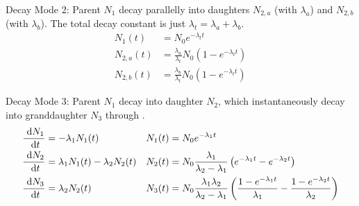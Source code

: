 \documentclass{school-22.101-notes}
\begin{document}
Decay Mode 2: Parent $N_1$ decay parallelly into daughters $N_{2,a}$ (with $\lambda_a$) and $N_{2,b}$ (with $\lambda_b$). The total decay constant is just $\lambda_t = \lambda_a + \lambda_b$. 
\begin{align}
N_1 (t) &= N_0 e^{-\lambda_t t} \\
N_{2,a} (t) &= \frac{\lambda_a}{\lambda_t} N_0 (1 - e^{-\lambda_t t}) \\
N_{2,b} (t) &= \frac{\lambda_b}{\lambda_t} N_0 (1 - e^{-\lambda_t t})
\end{align}

Decay Mode 3: Parent $N_1$ decay into daughter $N_2$, which instantaneously decay into granddaughter $N_3$ through .
\begin{align}
\frac{\mbox{ }\mathrm{d} N_1}{\mbox{ }\mathrm{d} t} &= -\lambda_1 N_1 (t)   & N_1 (t) &= N_{0} e^{-\lambda_1 t} \\
\frac{\mbox{ }\mathrm{d} N_2}{\mbox{ }\mathrm{d} t} &= \lambda_1 N_1 (t) - \lambda_2 N_2(t)   & N_2 (t) &= N_{0} \frac{\lambda_1}{\lambda_2 - \lambda_1} \left( e^{-\lambda_1 t} - e^{-\lambda_2 t} \right) \\
\frac{\mbox{ }\mathrm{d} N_3}{\mbox{ }\mathrm{d} t} &= \lambda_2 N_2 (t)    & N_3 (t) &= N_{0} \frac{\lambda_1 \lambda_2}{\lambda_2 - \lambda_1} \left( \frac{1 - e^{-\lambda_1 t} }{\lambda_1} - \frac{1- e^{-\lambda_2 t}}{\lambda_2} \right) 
\end{align}
\end{document}
